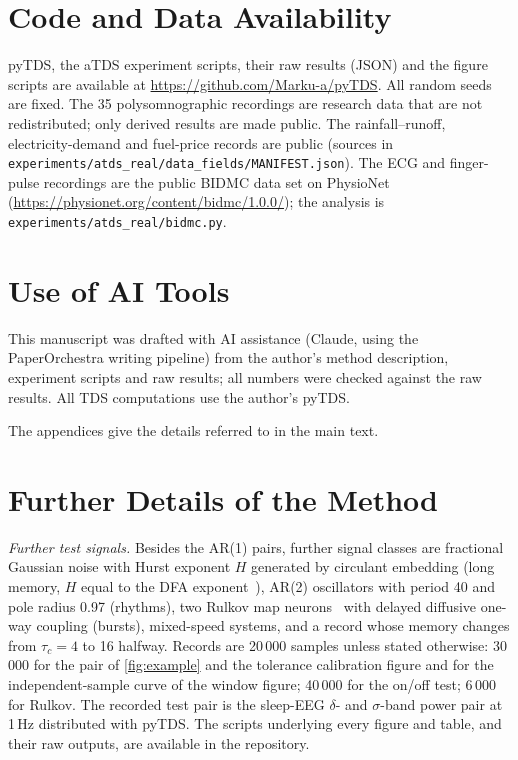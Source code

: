 \documentclass[11pt,a4paper]{article}
\begin{document}
\section*{Code and Data Availability}
pyTDS, the aTDS experiment scripts, their raw results (JSON) and the figure scripts are available at \url{https://github.com/Marku-a/pyTDS}. All random seeds are fixed. The 35 polysomnographic recordings are research data that are not redistributed; only derived results are made public. The rainfall--runoff, electricity-demand and fuel-price records are public (sources in \texttt{experiments/atds\_real/data\_fields/MANIFEST.json}). The ECG and finger-pulse recordings are the public BIDMC data set on PhysioNet (\url{https://physionet.org/content/bidmc/1.0.0/}); the analysis is \texttt{experiments/atds\_real/bidmc.py}.

\section*{Use of AI Tools}
This manuscript was drafted with AI assistance (Claude, using the PaperOrchestra writing pipeline) from the author's method description, experiment scripts and raw results; all numbers were checked against the raw results. All TDS computations use the author's pyTDS.





\clearpage
\appendix
\noindent The appendices give the details referred to in the main text.

\section{Further Details of the Method}
\label{app:method}

\emph{Further test signals.} Besides the AR(1) pairs, further signal classes are fractional Gaussian noise with Hurst exponent $H$ generated by circulant embedding (long memory, $H$ equal to the DFA exponent~\cite{Peng1995QuantificationScaling}), AR(2) oscillators with period 40 and pole radius 0.97 (rhythms), two Rulkov map neurons~\cite{Rulkov2002ModelingSpikingbursting} with delayed diffusive one-way coupling (bursts), mixed-speed systems, and a record whose memory changes from $\tau_c = 4$ to 16 halfway. Records are 20\,000 samples unless stated otherwise: 30\,000 for the pair of \cref{fig:example} and the tolerance calibration figure and for the independent-sample curve of the window figure; 40\,000 for the on/off test; 6\,000 for Rulkov. The recorded test pair is the sleep-EEG $\delta$- and $\sigma$-band power pair at 1\,Hz distributed with pyTDS. The scripts underlying every figure and table, and their raw outputs, are available in the repository.
\end{document}
